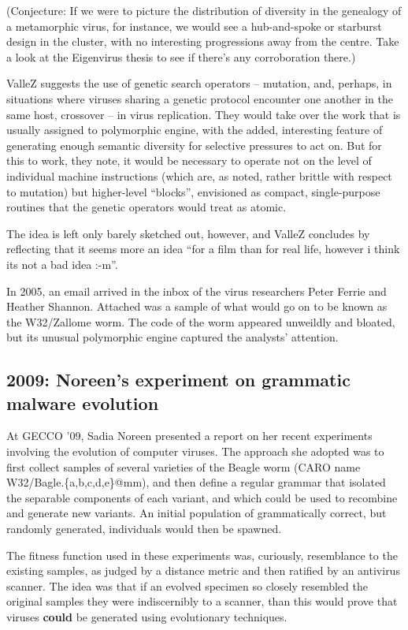 \documentclass[12pt,glossary]{dalthesis}
\begin{document}
(Conjecture: If we were to picture the distribution of diversity in the
genealogy of a metamorphic virus, for instance, we would see a hub-and-spoke or
starburst design in the cluster, with no interesting progressions away from the
centre. Take a look at the Eigenvirus thesis to see if there's any corroboration
there.)

ValleZ suggests the use of genetic search operators -- mutation, and, perhaps,
in situations where viruses sharing a genetic protocol encounter one another in
the same host, crossover -- in virus replication. They would take over the work
that is usually assigned to polymorphic engine, with the added, interesting
feature of generating enough semantic diversity for selective pressures to act
on. But for this to work, they note, it would be necessary to operate not on the
level of individual machine instructions (which are, as noted, rather brittle
with respect to mutation) but higher-level ``blocks'', envisioned as compact,
single-purpose routines that the genetic operators would treat as atomic.

The idea is left only barely sketched out, however, and ValleZ concludes by
reflecting that it seems more an idea ``for a film than for real life, however i
think its not a bad idea :-m''.


In 2005, an email arrived in the inbox of the virus researchers Peter Ferrie and
Heather Shannon. Attached was a sample of what would go on to be known as the
W32/Zallome worm. The code of the worm appeared unweildly and bloated, but its
unusual polymorphic engine captured the analysts' attention.

\subsection{2009: Noreen's experiment on grammatic malware evolution}
\label{sec:orga8072e0}

At GECCO '09, Sadia Noreen presented a report on her recent experiments
involving the evolution of computer viruses. The approach she adopted was to
first collect samples of several varieties of the Beagle worm (CARO name
W32/Bagle.\{a,b,c,d,e\}@mm), and then define a regular grammar that isolated the
separable components of each variant, and which could be used to recombine and
generate new variants. An initial population of grammatically correct, but
randomly generated, individuals would then be spawned.

The fitness function used in these experiments was, curiously, resemblance to
the existing samples, as judged by a distance metric and then ratified by an
antivirus scanner. The idea was that if an evolved specimen so closely resembled
the original samples they were indiscernibly to a scanner, than this would prove
that viruses \textbf{could} be generated using evolutionary techniques.
\end{document}
